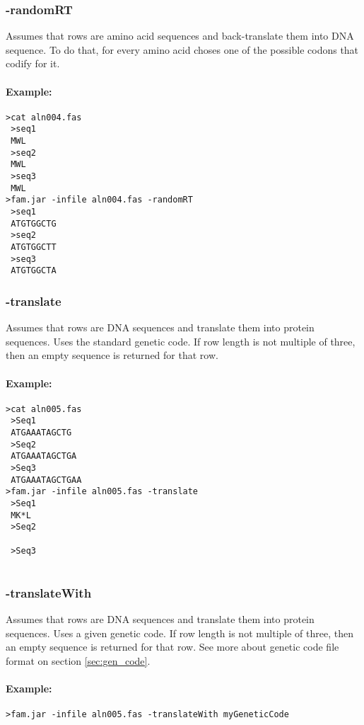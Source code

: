 \documentclass[a4paper, twoside,10pt]{article}
\begin{document}
\subsubsection{-randomRT}
Assumes that rows are amino acid sequences and back-translate them into 
DNA sequence. To do that, for every amino acid choses one of the possible 
codons that codify for it. 
\paragraph{Example:}
\begin{verbatim}
>cat aln004.fas
 >seq1
 MWL
 >seq2
 MWL
 >seq3
 MWL
>fam.jar -infile aln004.fas -randomRT
 >seq1
 ATGTGGCTG
 >seq2
 ATGTGGCTT
 >seq3
 ATGTGGCTA
\end{verbatim}

\subsubsection{-translate}
Assumes that rows are DNA sequences and translate them into 
protein sequences. Uses the standard genetic code. If row length is not 
multiple of three, then an empty sequence is returned for that row.
\paragraph{Example:}
\begin{verbatim}
>cat aln005.fas
 >Seq1
 ATGAAATAGCTG
 >Seq2
 ATGAAATAGCTGA
 >Seq3
 ATGAAATAGCTGAA
>fam.jar -infile aln005.fas -translate
 >Seq1
 MK*L
 >Seq2
 
 >Seq3
 
\end{verbatim}

\subsubsection{-translateWith}
Assumes that rows are DNA sequences and translate them into 
protein sequences. Uses a given genetic code. If row length is not 
multiple of three, then an empty sequence is returned for that row.
See more about genetic code file format on section \ref{sec:gen_code}.
\paragraph{Example:}
\begin{verbatim}
>fam.jar -infile aln005.fas -translateWith myGeneticCode
\end{verbatim}
\end{document}
